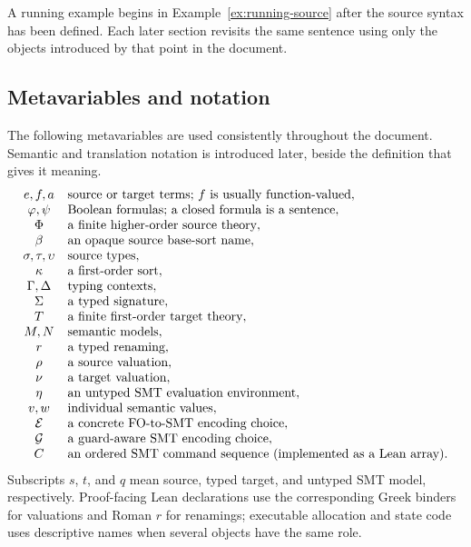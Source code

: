 \documentclass[11pt]{article}
\theoremstyle{remark}
\begin{document}
A running example begins in Example~\ref{ex:running-source} after the source
syntax has been defined. Each later section revisits the same sentence using
only the objects introduced by that point in the document.

\subsection{Metavariables and notation}

The following metavariables are used consistently throughout the document.
Semantic and translation notation is introduced later, beside the definition
that gives it meaning.
\[
\begin{array}{c@{\quad}l}
 e,f,a & \text{source or target terms; $f$ is usually function-valued},\\
 \varphi,\psi & \text{Boolean formulas; a closed formula is a sentence},\\
 \Phi & \text{a finite higher-order source theory},\\
 \beta & \text{an opaque source base-sort name},\\
 \sigma,\tau,\upsilon & \text{source types},\\
 \kappa & \text{a first-order sort},\\
 \Gamma,\Delta & \text{typing contexts},\\
 \Sigma & \text{a typed signature},\\
 T & \text{a finite first-order target theory},\\
 M,N & \text{semantic models},\\
 r & \text{a typed renaming},\\
 \rho & \text{a source valuation},\\
 \nu & \text{a target valuation},\\
 \eta & \text{an untyped SMT evaluation environment},\\
 v,w & \text{individual semantic values},\\
 \mathcal E & \text{a concrete FO-to-SMT encoding choice},\\
 \mathcal G & \text{a guard-aware SMT encoding choice},\\
 C & \text{an ordered SMT command sequence (implemented as a Lean array)}.
\end{array}
\]
Subscripts $s$, $t$, and $q$ mean source, typed target, and untyped SMT model,
respectively. Proof-facing Lean declarations use the corresponding Greek
binders for valuations and Roman $r$ for renamings; executable allocation and
state code uses descriptive names when several objects have the same role.
\end{document}
